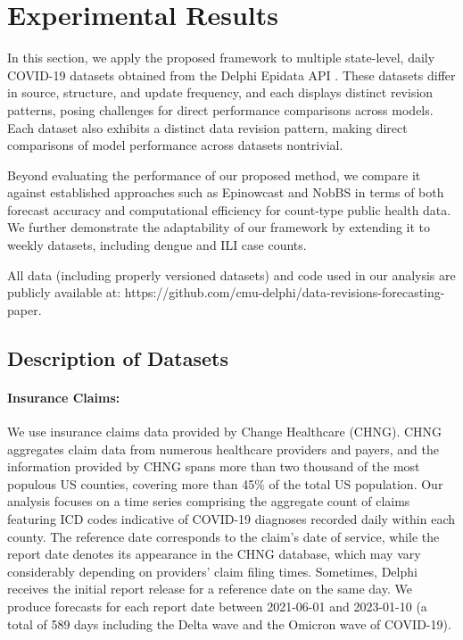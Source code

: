 \section{Experimental Results}
In this section, we apply the proposed framework to multiple state-level, daily COVID-19 datasets obtained from the Delphi Epidata API \cite{farrow2015delphi}. These datasets differ in source, structure, and update frequency, and each displays distinct revision patterns, posing challenges for direct performance comparisons across models. Each dataset also exhibits a distinct data revision pattern, making direct comparisons of model performance across datasets nontrivial. 

Beyond evaluating the performance of our proposed method, we compare it against established approaches such as Epinowcast and NobBS in terms of both forecast accuracy and computational efficiency for count-type public health data. We further demonstrate the adaptability of our framework by extending it to weekly datasets, including dengue and ILI case counts. 

All data (including properly versioned datasets) and code used in our analysis are publicly available at:
https://github.com/cmu-delphi/data-revisions-forecasting-paper.

\subsection{Description of Datasets}
\paragraph{Insurance Claims:} We use insurance claims data provided by Change Healthcare (CHNG). CHNG aggregates claim data from numerous healthcare providers and payers, and the information provided by CHNG spans more than two thousand of the most populous US counties, covering more than 45\% of the total US population. Our analysis focuses on a time series comprising the aggregate count of claims featuring ICD codes indicative of COVID-19 diagnoses recorded daily within each county. The reference date corresponds to the claim's date of service, while the report date denotes its appearance in the CHNG database, which may vary considerably depending on providers' claim filing times. Sometimes, Delphi receives the initial report release for a reference date on the same day. We produce forecasts for each report date between 2021-06-01 and 2023-01-10 (a total of 589 days including the Delta wave and the Omicron wave of COVID-19). 

